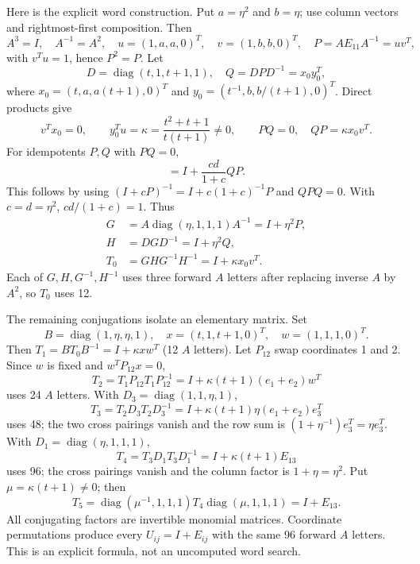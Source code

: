 Here is the explicit word construction. Put $a=\eta^2$ and $b=\eta$;
use column vectors and rightmost-first composition. Then
\[
 A^3=I,\quad A^{-1}=A^2,\quad
 u=(1,a,a,0)^T,\quad v=(1,b,b,0)^T,\quad
 P=AE_{11}A^{-1}=uv^T,
\]
with $v^Tu=1$, hence $P^2=P$. Let
\[
 D=\operatorname{diag}(t,1,t+1,1),\quad Q=DPD^{-1}=x_0y_0^T,
\]
where $x_0=(t,a,a(t+1),0)^T$ and
$y_0=(t^{-1},b,b/(t+1),0)^T$. Direct products give
\begin{equation}
 v^Tx_0=0,\qquad y_0^Tu=\kappa
 =\frac{t^2+t+1}{t(t+1)}\ne0,
 \qquad PQ=0,\quad QP=\kappa x_0v^T.                 \label{eq:positive-18}
\end{equation}
For idempotents $P,Q$ with $PQ=0$,
\begin{equation}
 [I+cP,I+dQ]=I+\frac{cd}{1+c}QP.                    \label{eq:positive-19}
\end{equation}
This follows by using $(I+cP)^{-1}=I+c(1+c)^{-1}P$ and
$QPQ=0$. With $c=d=\eta^2$, $cd/(1+c)=1$. Thus
\begin{equation}
\begin{aligned}
 G&=A\operatorname{diag}(\eta,1,1,1)A^{-1}=I+\eta^2P,\\
 H&=DGD^{-1}=I+\eta^2Q,\\
 T_0&=GHG^{-1}H^{-1}=I+\kappa x_0v^T.
\end{aligned}\label{eq:positive-20}
\end{equation}
Each of $G,H,G^{-1},H^{-1}$ uses three forward $A$ letters after
replacing inverse $A$ by $A^2$, so $T_0$ uses 12.

The remaining conjugations isolate an elementary matrix. Set
\[
 B=\operatorname{diag}(1,\eta,\eta,1),\quad
 x=(t,1,t+1,0)^T,\quad w=(1,1,1,0)^T.
\]
Then $T_1=BT_0B^{-1}=I+\kappa xw^T$ (12 $A$ letters). Let $P_{12}$
swap coordinates 1 and 2. Since $w$ is fixed and $w^TP_{12}x=0$,
\begin{equation}
 T_2=T_1P_{12}T_1P_{12}^{-1}
   =I+\kappa(t+1)(e_1+e_2)w^T                       \label{eq:positive-21}
\end{equation}
uses 24 $A$ letters. With $D_3=\operatorname{diag}(1,1,\eta,1)$,
\begin{equation}
 T_3=T_2D_3T_2D_3^{-1}
   =I+\kappa(t+1)\eta(e_1+e_2)e_3^T                \label{eq:positive-22}
\end{equation}
uses 48; the two cross pairings vanish and the row sum is
$(1+\eta^{-1})e_3^T=\eta e_3^T$. With
$D_1=\operatorname{diag}(\eta,1,1,1)$,
\begin{equation}
 T_4=T_3D_1T_3D_1^{-1}
   =I+\kappa(t+1)E_{13}                             \label{eq:positive-23}
\end{equation}
uses 96; the cross pairings vanish and the column factor is
$1+\eta=\eta^2$. Put $\mu=\kappa(t+1)\ne0$; then
\begin{equation}
 T_5=\operatorname{diag}(\mu^{-1},1,1,1)
       T_4\operatorname{diag}(\mu,1,1,1)=I+E_{13}.  \label{eq:positive-24}
\end{equation}
All conjugating factors are invertible monomial matrices. Coordinate
permutations produce every $U_{ij}=I+E_{ij}$ with the same 96 forward
$A$ letters. This is an explicit formula, not an uncomputed word search.

